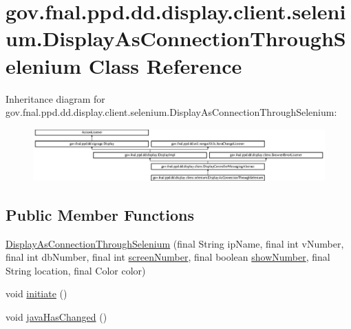 \hypertarget{classgov_1_1fnal_1_1ppd_1_1dd_1_1display_1_1client_1_1selenium_1_1DisplayAsConnectionThroughSelenium}{\section{gov.\-fnal.\-ppd.\-dd.\-display.\-client.\-selenium.\-Display\-As\-Connection\-Through\-Selenium Class Reference}
\label{classgov_1_1fnal_1_1ppd_1_1dd_1_1display_1_1client_1_1selenium_1_1DisplayAsConnectionThroughSelenium}
}
Inheritance diagram for gov.\-fnal.\-ppd.\-dd.\-display.\-client.\-selenium.\-Display\-As\-Connection\-Through\-Selenium\-:\begin{figure}[H]
\begin{center}
\leavevmode
\includegraphics[height=2.015839cm]{classgov_1_1fnal_1_1ppd_1_1dd_1_1display_1_1client_1_1selenium_1_1DisplayAsConnectionThroughSelenium}
\end{center}
\end{figure}
\subsection*{Public Member Functions}
\begin{DoxyCompactItemize}
\item 
\hyperlink{classgov_1_1fnal_1_1ppd_1_1dd_1_1display_1_1client_1_1selenium_1_1DisplayAsConnectionThroughSelenium_abb5c9f83153fe7d81a5dcf2c8dd88e67}{Display\-As\-Connection\-Through\-Selenium} (final String ip\-Name, final int v\-Number, final int db\-Number, final int \hyperlink{classgov_1_1fnal_1_1ppd_1_1dd_1_1display_1_1DisplayImpl_ace620614bde13cee492129c27f38db4e}{screen\-Number}, final boolean \hyperlink{classgov_1_1fnal_1_1ppd_1_1dd_1_1display_1_1client_1_1DisplayControllerMessagingAbstract_aca138d2835d0f3794bc86261ad550f18}{show\-Number}, final String location, final Color color)
\item 
void \hyperlink{classgov_1_1fnal_1_1ppd_1_1dd_1_1display_1_1client_1_1selenium_1_1DisplayAsConnectionThroughSelenium_ab305c221b590a686a18f4bd7072cf730}{initiate} ()
\item 
void \hyperlink{classgov_1_1fnal_1_1ppd_1_1dd_1_1display_1_1client_1_1selenium_1_1DisplayAsConnectionThroughSelenium_a17d23c1c5e1a8ded785bcea9c5c1e5dd}{java\-Has\-Changed} ()
\end{DoxyCompactItemize}
